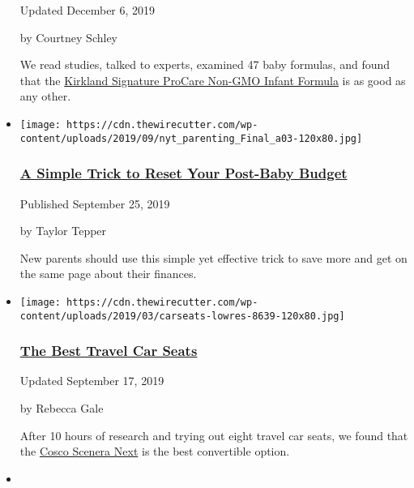 \begin{itemize}
  Updated December 6, 2019

  by Courtney Schley

  We read studies, talked to experts, examined 47 baby formulas, and
  found that the
  \href{https://www.nytimes3xbfgragh.onion/wirecutter/out/link/36104/158381/4/105675/?merchant=Costco}{Kirkland
  Signature ProCare Non-GMO Infant Formula} is as good as any other.
\item
  \href{https://www.nytimes3xbfgragh.onion/wirecutter/money/new-baby-budget/}{}

  \texttt{[image: https://cdn.thewirecutter.com/wp-content/uploads/2019/09/nyt\_parenting\_Final\_a03-120x80.jpg]}

  \hypertarget{a-simple-trick-to-reset-your-post-baby-budget}{%
  \subsubsection{\texorpdfstring{\href{https://www.nytimes3xbfgragh.onion/wirecutter/money/new-baby-budget/}{A
  Simple Trick to Reset Your Post-Baby
  Budget}}{A Simple Trick to Reset Your Post-Baby Budget}}\label{a-simple-trick-to-reset-your-post-baby-budget}}

  Published September 25, 2019

  by Taylor Tepper

  New parents should use this simple yet effective trick to save more
  and get on the same page about their finances.
\item
  \href{https://www.nytimes3xbfgragh.onion/wirecutter/reviews/best-travel-car-seats/}{}

  \texttt{[image: https://cdn.thewirecutter.com/wp-content/uploads/2019/03/carseats-lowres-8639-120x80.jpg]}

  \hypertarget{the-best-travel-car-seats}{%
  \subsubsection{\texorpdfstring{\href{https://www.nytimes3xbfgragh.onion/wirecutter/reviews/best-travel-car-seats/}{The
  Best Travel Car
  Seats}}{The Best Travel Car Seats}}\label{the-best-travel-car-seats}}

  Updated September 17, 2019

  by Rebecca Gale

  After 10 hours of research and trying out eight travel car seats, we
  found that the
  \href{https://www.nytimes3xbfgragh.onion/wirecutter/out/link/31698/152378/4/89449/?merchant=Walmart}{Cosco
  Scenera Next} is the best convertible option.
\item
  \href{https://www.nytimes3xbfgragh.onion/wirecutter/reviews/best-baby-monitor/}{}


\end{itemize}
